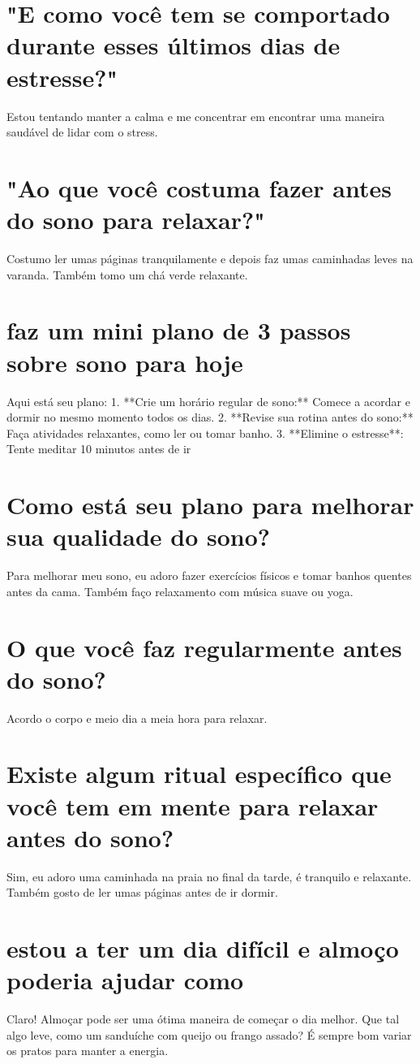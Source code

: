 \documentclass[11pt,a4paper]{article}
\begin{document}
\section{"E como você tem se comportado durante esses últimos dias de estresse?"}
Estou tentando manter a calma e me concentrar em encontrar uma maneira saudável de lidar com o stress.

\section{"Ao que você costuma fazer antes do sono para relaxar?"}
Costumo ler umas páginas tranquilamente e depois faz umas caminhadas leves na varanda. Também tomo um chá verde relaxante.

\section{faz um mini plano de 3 passos sobre sono para hoje}
Aqui está seu plano: 1. **Crie um horário regular de sono:** Comece a acordar e dormir no mesmo momento todos os dias. 2. **Revise sua rotina antes do sono:** Faça atividades relaxantes, como ler ou tomar banho. 3. **Elimine o estresse**: Tente meditar 10 minutos antes de ir

\section{Como está seu plano para melhorar sua qualidade do sono?}
Para melhorar meu sono, eu adoro fazer exercícios físicos e tomar banhos quentes antes da cama. Também faço relaxamento com música suave ou yoga.

\section{O que você faz regularmente antes do sono?}
Acordo o corpo e meio dia a meia hora para relaxar.

\section{Existe algum ritual específico que você tem em mente para relaxar antes do sono?}
Sim, eu adoro uma caminhada na praia no final da tarde, é tranquilo e relaxante. Também gosto de ler umas páginas antes de ir dormir.

\section{estou a ter um dia difícil e almoço poderia ajudar como}
Claro! Almoçar pode ser uma ótima maneira de começar o dia melhor. Que tal algo leve, como um sanduíche com queijo ou frango assado? É sempre bom variar os pratos para manter a energia.
\end{document}
